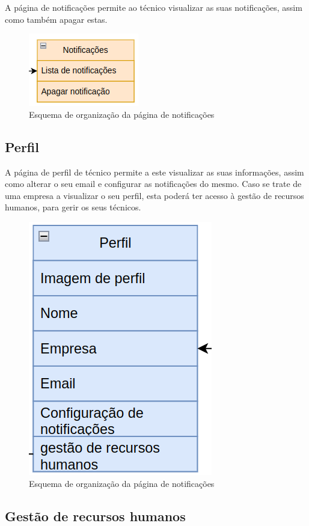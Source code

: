 A página de notificações permite ao técnico visualizar as suas notificações, assim como também apagar estas.
\begin{figure}[htb]
    \centering
    
    \includegraphics[height=0.2\textwidth]{images/Arquiteturas/superficial_de_app/notificacoes.png}
    \caption{Esquema de organização da página de notificações}
    \label{fig:9}
\end{figure}

\subsection{Perfil}

A página de perfil de técnico permite a este visualizar as suas informações, assim como alterar 
o seu email e configurar as notificações do mesmo. Caso se trate de uma empresa a visualizar o seu perfil,
esta poderá ter acesso à gestão de recursos humanos, para gerir os seus técnicos.
\begin{figure}[htb]
    \centering
    
    \includegraphics[height=0.35\textwidth]{images/Arquiteturas/superficial_de_app/perfil.png}
    \caption{Esquema de organização da página de notificações}
    \label{fig:10}
\end{figure}

\newpage

\subsection{Gestão de recursos humanos}

